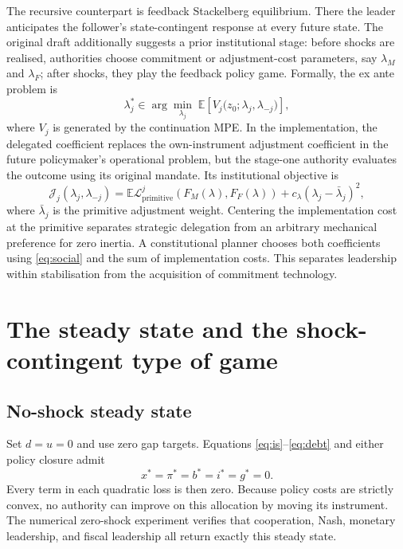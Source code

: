 \documentclass[11pt]{article}
\newcommand{\E}{\mathbb{E}}
\newcommand{\loss}{\mathcal{L}}
\begin{document}
The recursive counterpart is feedback Stackelberg equilibrium.  There the
leader anticipates the follower's state-contingent response at every future
state.  The original draft additionally suggests a prior institutional stage:
before shocks are realised, authorities choose commitment or adjustment-cost
parameters, say $\lambda_M$ and $\lambda_F$; after shocks, they play the
feedback policy game.  Formally, the ex ante problem is
\begin{equation}
 \lambda_j^*\in\arg\min_{\lambda_j}\;
 \E\!\left[V_j\bigl(z_0;\lambda_j,\lambda_{-j}\bigr)\right],     \label{eq:meta}
\end{equation}
where $V_j$ is generated by the continuation MPE.  In the implementation, the
delegated coefficient replaces the own-instrument adjustment coefficient in
the future policymaker's operational problem, but the stage-one authority
evaluates the outcome using its original mandate.  Its institutional objective
is
\begin{equation}
 \mathcal J_j(\lambda_j,\lambda_{-j})=
 \E\loss^j_{\mathrm{primitive}}\!\left(F_M(\lambda),F_F(\lambda)\right)
 +c_\lambda(\lambda_j-\bar\lambda_j)^2,                         \label{eq:investment}
\end{equation}
where $\bar\lambda_j$ is the primitive adjustment weight.  Centering the
implementation cost at the primitive separates strategic delegation from an
arbitrary mechanical preference for zero inertia.  A constitutional planner
chooses both coefficients using \eqref{eq:social} and the sum of implementation
costs.  This separates leadership within stabilisation from the acquisition of
commitment technology.

\section{The steady state and the shock-contingent type of game}

\subsection{No-shock steady state}

Set $d=u=0$ and use zero gap targets.  Equations
\eqref{eq:is}--\eqref{eq:debt} and either policy closure admit
\begin{equation}
 x^*=\pi^*=b^*=i^*=g^*=0.                                      \label{eq:ss}
\end{equation}
Every term in each quadratic loss is then zero.  Because policy costs are
strictly convex, no authority can improve on this allocation by moving its
instrument.  The numerical zero-shock experiment verifies that cooperation,
Nash, monetary leadership, and fiscal leadership all return exactly this
steady state.
\end{document}
